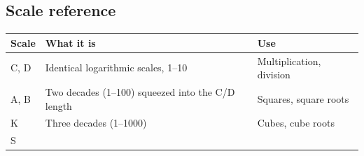 \documentclass[
  10pt,
]{article}
\begin{document}
\hypertarget{scale-reference}{%
\subsection{Scale reference}\label{scale-reference}}

\begin{longtable}[]{@{}lll@{}}
\toprule
\begin{minipage}[b]{0.28\columnwidth}\raggedright
Scale\strut
\end{minipage} & \begin{minipage}[b]{0.44\columnwidth}\raggedright
What it is\strut
\end{minipage} & \begin{minipage}[b]{0.20\columnwidth}\raggedright
Use\strut
\end{minipage}\tabularnewline
\midrule
\endhead
\begin{minipage}[t]{0.28\columnwidth}\raggedright
C, D\strut
\end{minipage} & \begin{minipage}[t]{0.44\columnwidth}\raggedright
Identical logarithmic scales, 1--10\strut
\end{minipage} & \begin{minipage}[t]{0.20\columnwidth}\raggedright
Multiplication, division\strut
\end{minipage}\tabularnewline
\begin{minipage}[t]{0.28\columnwidth}\raggedright
A, B\strut
\end{minipage} & \begin{minipage}[t]{0.44\columnwidth}\raggedright
Two decades (1--100) squeezed into the C/D length\strut
\end{minipage} & \begin{minipage}[t]{0.20\columnwidth}\raggedright
Squares, square roots\strut
\end{minipage}\tabularnewline
\begin{minipage}[t]{0.28\columnwidth}\raggedright
K\strut
\end{minipage} & \begin{minipage}[t]{0.44\columnwidth}\raggedright
Three decades (1--1000)\strut
\end{minipage} & \begin{minipage}[t]{0.20\columnwidth}\raggedright
Cubes, cube roots\strut
\end{minipage}\tabularnewline
\begin{minipage}[t]{0.28\columnwidth}\raggedright
S\strut
\end{minipage} & \begin{minipage}[t]{0.44\columnwidth}\raggedright

\end{minipage}
\end{longtable}
\end{document}
